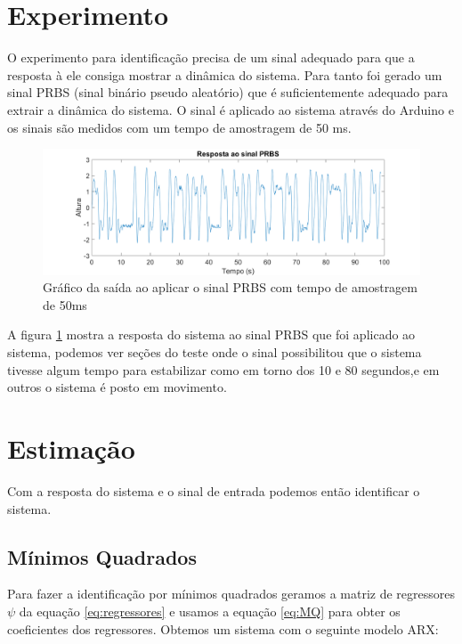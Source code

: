 \section{Experimento}\label{s:4experimento}
O experimento para identificação precisa de um sinal adequado para que a resposta à ele consiga mostrar a dinâmica do sistema. Para tanto foi gerado um sinal PRBS (sinal binário pseudo aleatório) que é suficientemente adequado para extrair a dinâmica do sistema. O sinal é aplicado ao sistema através do Arduino e os sinais são medidos com um tempo de amostragem de 50 ms.
\begin{figure}[H]
	\centering
	\includegraphics[width=1.1\linewidth]{sinalprbsid}
	\caption[Gráfico da saída PRBS]{Gráfico da saída ao aplicar o sinal PRBS com tempo de amostragem de 50ms}
	\label{fig:sinalprbsid}
\end{figure}

A figura \ref{fig:sinalprbsid} mostra a resposta do sistema ao sinal PRBS que foi aplicado ao sistema, podemos ver seções do teste onde o sinal possibilitou que o sistema tivesse algum tempo para estabilizar como em torno dos 10 e 80 segundos,e em outros o sistema é posto em movimento.

\section{Estimação}\label{s:4estimacao}

Com a resposta do sistema e o sinal de entrada podemos então identificar o sistema.
\subsection{Mínimos Quadrados}\label{s:4estmq}
Para fazer a identificação por mínimos quadrados geramos a matriz de regressores $\psi$ da equação \ref{eq:regressores} e usamos a equação \ref{eq:MQ} para obter os coeficientes dos regressores. Obtemos um sistema com o seguinte modelo ARX:


